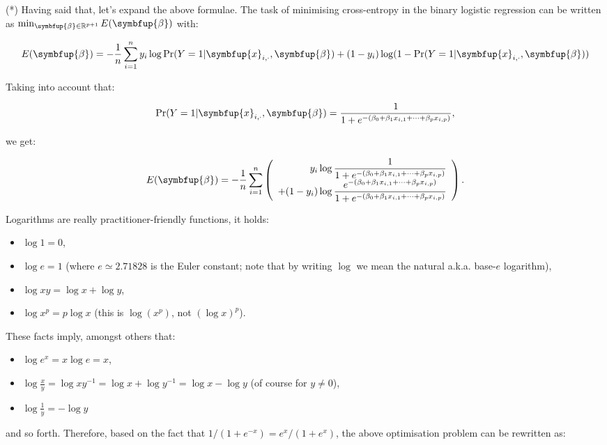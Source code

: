 \documentclass[10pt,b5paper,krantz1]{krantz}
\providecommand{\tightlist}{%
  \setlength{\itemsep}{0pt}\setlength{\parskip}{0pt}}
\renewcommand{\mathbf}[1]{\symbfup{#1}}
\renewcommand{\boldsymbol}[1]{\symbfup{#1}}
\begin{document}
\bigskip

(*) Having said that, let's expand the above formulae.
The task of minimising cross-entropy in the binary logistic regression
can be written as \(\min_{\boldsymbol\beta\in\mathbb{R}^{p+1}} E(\boldsymbol\beta)\)
with:

\[
E(\boldsymbol\beta)=
-\frac{1}{n} \sum_{i=1}^n
y_i \log \Pr(Y=1|\mathbf{x}_{i,\cdot},\boldsymbol\beta)
+ (1-y_i) \log(1-\Pr(Y=1|\mathbf{x}_{i,\cdot},\boldsymbol\beta))
\]

Taking into account that:

\[
\Pr(Y=1|\mathbf{x}_{i,\cdot},\boldsymbol\beta)=
\frac{1}{1+e^{-(\beta_0 + \beta_1 x_{i,1}+\dots+\beta_p x_{i,p})}},
\]

we get:

\[
E(\boldsymbol\beta)=
-\frac{1}{n}
\sum_{i=1}^n \left(
\begin{array}{r}
y_i \log \displaystyle\frac{1}{1+e^{-(\beta_0 + \beta_1 x_{i,1}+\dots+\beta_p x_{i,p})}}\\
+
(1-y_i) \log \displaystyle\frac{e^{-(\beta_0 + \beta_1 x_{i,1}+\dots+\beta_p x_{i,p})}}{1+e^{-(\beta_0 + \beta_1 x_{i,1}+\dots+\beta_p x_{i,p})}}
\end{array}
\right).
\]

Logarithms are really practitioner-friendly functions,
it holds:

\begin{itemize}
\tightlist
\item
  \(\log 1=0\),
\item
  \(\log e=1\) (where \(e \simeq 2.71828\) is the Euler constant;
  note that by writing \(\log\) we mean the natural a.k.a. base-\(e\) logarithm),
\item
  \(\log xy = \log x + \log y\),
\item
  \(\log x^p = p\log x\) (this is \(\log (x^p)\), not \((\log x)^p\)).
\end{itemize}

These facts imply, amongst others that:

\begin{itemize}
\tightlist
\item
  \(\log e^x = x \log e = x\),
\item
  \(\log \frac{x}{y} = \log x y^{-1} = \log x+\log y^{-1} = \log x - \log y\)
  (of course for \(y\neq 0\)),
\item
  \(\log \frac{1}{y} = -\log y\)
\end{itemize}

and so forth. Therefore,
based on the fact that
\(1/(1+e^{-x})=e^x/(1+e^x)\),
the above optimisation problem can be rewritten as:
\end{document}
